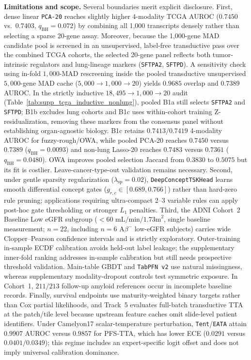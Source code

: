 \documentclass[10pt,twocolumn]{article}
\begin{document}
\noindent\textbf{Limitations and scope.}
Several boundaries merit explicit disclosure. First, dense linear \texttt{PCA-20} reaches
slightly higher 4-modality TCGA AUROC ($0.7450$ vs.\ $0.7403$, $q_{\text{BH}}=0.072$) by
combining all 1,000 transcripts densely rather than selecting a sparse 20-gene assay. Moreover,
because the 1,000-gene MAD candidate pool is screened in an unsupervised, label-free
transductive pass over the combined TCGA cohorts, the selected 20-gene panel reflects both
tumor-intrinsic regulators and lung-lineage markers (\texttt{SFTPA2}, \texttt{SFTPD}). A
sensitivity check using in-fold $1,000$-MAD rescreening inside the pooled
transductive unsupervised $5,000$-gene MAD cache ($5,000 \to 1,000 \to 20$) yields $0.9685$
overlap and $0.7389$ AUROC. In the strictly inductive $18,495\to1,000\to20$ audit
(Table~\ref{tab:supp_tcga_inductive_nonlung}), pooled B1a still selects \texttt{SFTPA2} and
\texttt{SFTPD}; B1b excludes lung cohorts and B1c uses within-cohort training
Z-residualization, removing these markers from the consensus panel without establishing
organ-agnostic biology. B1c retains $0.7413/0.7419$ 4-modality AUROC for fuzzy-rough/OWA,
while pooled PCA-20 reaches $0.7450$ versus $0.7389$ ($q_{\mathrm{BH}}=0.0093$) and non-lung
Lasso-20 reaches $0.7483$ versus $0.7361$ ($q_{\mathrm{BH}}=0.0480$). OWA improves pooled
selection Jaccard from $0.3830$ to $0.5075$ but its fit is costlier. Leave-cancer-type-out
validation remains necessary. Second, under gentle sparsity regularization
($\lambda_{\text{sp}}=0.02$),
\texttt{DeepConceptTSKHead} learns smooth differential concept gates ($g_{r,c} \in [0.689,
0.766]$) rather than hard-zero rule pruning; applications requiring ultra-compact 2--3 variable
rules can apply post-hoc gate thresholding or stronger $L_1$ penalties. Third, the ADNI
Cohort~2 Baseline Low eGFR subgroup ($<60\text{ mL/min/1.73m}^2$, single baseline
measurement; $n=22$, including $n=6$ A$\beta^-$ low-eGFR subjects) carries wide
Clopper--Pearson confidence intervals and is strictly exploratory. Outer-training in-sample
ECDF calibration avoids held-out label leakage; the supplementary inner-fold ranking addresses
in-sample calibration but still needs prospective threshold validation. Main-table GBDT and
\texttt{TabPFN~v2} use natural missingness, whereas supplementary modality-dropout controls
test symmetric exposure. In Cohort~1, $211/213$ follow-up amyloid references occur in
incomplete baseline records. Finally, survival endpoints
use maturity-weighted binary targets rather than Cox partial likelihoods, and Track~5 evaluates
full-batch transductive TTA at the patch/tile level because upstream feature caches omit
slide-level patient identifiers. Under Camelyon17 scalar-temperature perturbation,
\texttt{Tent}/\texttt{EATA} attain $0.9907$ AUROC versus $0.9857$ for PFS-TTA, which has
lower ECE ($0.0291$ versus $0.0401/0.0349$); this regime includes an expert-specific logit
offset and does not imply universal calibration dominance.
\end{document}
